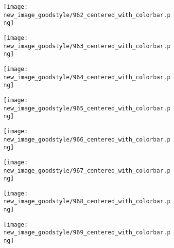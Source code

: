 \documentclass[a4paper,12pt]{article}
\begin{document}
\begin{figure}[H]
  \begin{subfigure}{0.11\textwidth}
    \texttt{[image: new\_image\_goodstyle/962\_centered\_with\_colorbar.png]}
  \end{subfigure}
  \hfill
  \begin{subfigure}{0.11\textwidth}
    \texttt{[image: new\_image\_goodstyle/963\_centered\_with\_colorbar.png]}
  \end{subfigure}
  \hfill
  \begin{subfigure}{0.11\textwidth}
    \texttt{[image: new\_image\_goodstyle/964\_centered\_with\_colorbar.png]}
  \end{subfigure}
  \hfill
  \begin{subfigure}{0.11\textwidth}
    \texttt{[image: new\_image\_goodstyle/965\_centered\_with\_colorbar.png]}
  \end{subfigure}
  \hfill
  \begin{subfigure}{0.11\textwidth}
    \texttt{[image: new\_image\_goodstyle/966\_centered\_with\_colorbar.png]}
  \end{subfigure}
  \hfill
  \begin{subfigure}{0.11\textwidth}
    \texttt{[image: new\_image\_goodstyle/967\_centered\_with\_colorbar.png]}
  \end{subfigure}
  \hfill
  \begin{subfigure}{0.11\textwidth}
    \texttt{[image: new\_image\_goodstyle/968\_centered\_with\_colorbar.png]}
  \end{subfigure}
  \hfill
  \begin{subfigure}{0.11\textwidth}
    \texttt{[image: new\_image\_goodstyle/969\_centered\_with\_colorbar.png]}
  \end{subfigure}
  \hfill
\end{figure}
\end{document}
